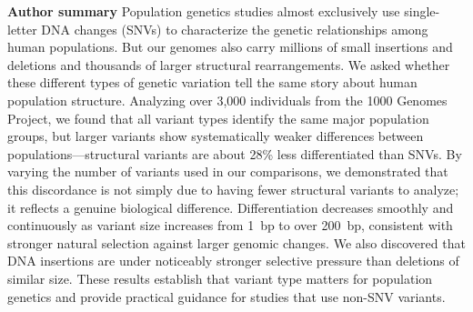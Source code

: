 \noindent\textbf{Author summary}\quad
Population genetics studies almost exclusively use single-letter DNA changes (SNVs) to characterize the genetic relationships among human populations. But our genomes also carry millions of small insertions and deletions and thousands of larger structural rearrangements. We asked whether these different types of genetic variation tell the same story about human population structure. Analyzing over 3,000 individuals from the 1000 Genomes Project, we found that all variant types identify the same major population groups, but larger variants show systematically weaker differences between populations---structural variants are about 28\% less differentiated than SNVs. By varying the number of variants used in our comparisons, we demonstrated that this discordance is not simply due to having fewer structural variants to analyze; it reflects a genuine biological difference. Differentiation decreases smoothly and continuously as variant size increases from 1~bp to over 200~bp, consistent with stronger natural selection against larger genomic changes. We also discovered that DNA insertions are under noticeably stronger selective pressure than deletions of similar size. These results establish that variant type matters for population genetics and provide practical guidance for studies that use non-SNV variants.
